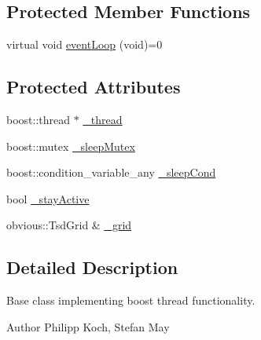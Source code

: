 \subsection*{Protected Member Functions}
\begin{DoxyCompactItemize}
\item 
virtual void \hyperlink{classohm__tsd__slam__ref_1_1ThreadSLAM_a7f8eec542ea75b833d981b9c4af5beb0}{event\-Loop} (void)=0
\end{DoxyCompactItemize}
\subsection*{Protected Attributes}
\begin{DoxyCompactItemize}
\item 
boost\-::thread $\ast$ \hyperlink{classohm__tsd__slam__ref_1_1ThreadSLAM_af046376720757fbc1c2302809fd6ba07}{\-\_\-thread}
\item 
boost\-::mutex \hyperlink{classohm__tsd__slam__ref_1_1ThreadSLAM_aa461c69e9be71020e371babc6e534120}{\-\_\-sleep\-Mutex}
\item 
boost\-::condition\-\_\-variable\-\_\-any \hyperlink{classohm__tsd__slam__ref_1_1ThreadSLAM_a0302ee2027cf077f552395da5c618c30}{\-\_\-sleep\-Cond}
\item 
bool \hyperlink{classohm__tsd__slam__ref_1_1ThreadSLAM_a303f8c9d58dca22db1f1f9c0e37cf6e4}{\-\_\-stay\-Active}
\item 
obvious\-::\-Tsd\-Grid \& \hyperlink{classohm__tsd__slam__ref_1_1ThreadSLAM_ab0eaf26f3b9c549fe0d21332f88ccc35}{\-\_\-grid}
\end{DoxyCompactItemize}


\subsection{Detailed Description}
Base class implementing boost thread functionality. 

\begin{DoxyAuthor}{Author}
Philipp Koch, Stefan May 
\end{DoxyAuthor}


